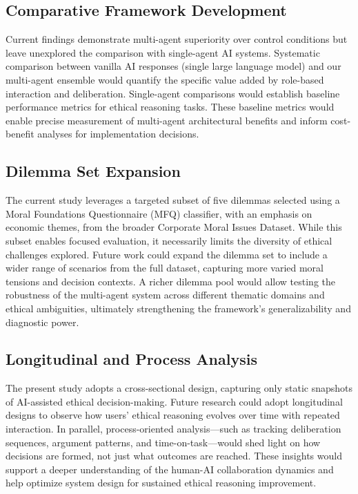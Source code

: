 \subsection{Comparative Framework Development}

Current findings demonstrate multi-agent superiority over control conditions but leave unexplored the comparison with single-agent AI systems. Systematic comparison between vanilla AI responses (single large language model) and our multi-agent ensemble would quantify the specific value added by role-based interaction and deliberation. Single-agent comparisons would establish baseline performance metrics for ethical reasoning tasks. These baseline metrics would enable precise measurement of multi-agent architectural benefits and inform cost-benefit analyses for implementation decisions.

\subsection{Dilemma Set Expansion}

The current study leverages a targeted subset of five dilemmas selected using a Moral Foundations Questionnaire (MFQ) classifier, with an emphasis on economic themes, from the broader Corporate Moral Issues Dataset. While this subset enables focused evaluation, it necessarily limits the diversity of ethical challenges explored. Future work could expand the dilemma set to include a wider range of scenarios from the full dataset, capturing more varied moral tensions and decision contexts. A richer dilemma pool would allow testing the robustness of the multi-agent system across different thematic domains and ethical ambiguities, ultimately strengthening the framework’s generalizability and diagnostic power.

\subsection{Longitudinal and Process Analysis}

The present study adopts a cross-sectional design, capturing only static snapshots of AI-assisted ethical decision-making. Future research could adopt longitudinal designs to observe how users’ ethical reasoning evolves over time with repeated interaction. In parallel, process-oriented analysis—such as tracking deliberation sequences, argument patterns, and time-on-task—would shed light on how decisions are formed, not just what outcomes are reached. These insights would support a deeper understanding of the human-AI collaboration dynamics and help optimize system design for sustained ethical reasoning improvement.

